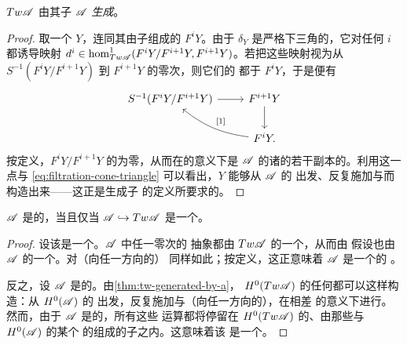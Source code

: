 \begin{lemma}\label{thm:tw-generated-by-a}
$Tw\mathscr{A}$ 由其\trFull{}子\trCategory{} $\mathscr{A}$ \emph{生成}。
\end{lemma}

\begin{proof}
取一个\trTwistedComplex{} $Y$，连同其由子\trComplex{}组成的\trFiltration{}%
$F^iY$。由于 $\delta_Y$ 是严格下三角的，它对任何 $i$ 都诱导映射
$d^i\in\hom^1_{Tw\mathscr{A}}(F^iY/F^{i+1}Y,F^{i+1}Y)$。若把这些映射视为从
$S^{-1}(F^iY/F^{i+1}Y)$ 到 $F^{i+1}Y$ 的零次\trMorphism，则它们的\trMappingCone{}%
都\trIsomorphic{}于 $F^iY$，于是便有\trExactTriangle
\begin{equation}\label{eq:filtration-cone-triangle}
\begin{tikzcd}
S^{-1}(F^iY/F^{i+1}Y) \ar[r] & F^{i+1}Y \ar[d] \\
& F^iY. \ar[ul,bend left=15,"{[1]}"{swap}]
\end{tikzcd}
\end{equation}
按定义，$F^iY/F^{i+1}Y$ 的\trDifferential{}为零，从而在\trIsomorphism{}的意义下是
$\mathscr{A}$ 的诸\trObject{}的若干\trSuspension{}副本的\trDirectSum。利用这一点与
\eqref{eq:filtration-cone-triangle} 可以看出，$Y$ 能够从 $\mathscr{A}$ 的\trObject{}%
出发、反复施加\trCone{}与\trSuspension{}而构造出来——这正是生成子%
\trCategory{}的定义所要求的。
\end{proof}

\begin{lemma}\label{thm:triangulated-iff-quasi-equivalence}
\trACategory{} $\mathscr{A}$ 是\trTriangulated{}的，当且仅当\trEmbedding{}%
$\mathscr{A}\hookrightarrow Tw\mathscr{A}$ 是一个\trQuasiequivalence。
\end{lemma}

\begin{proof}
设该\trEmbedding{}是一个\trQuasiequivalence。$\mathscr{A}$ 中任一零次\trCocycle{}的
抽象\trMappingCone{}都由 $Tw\mathscr{A}$ 的一个\trObject{}\trQuasiRepresent，从而由
假设也由 $\mathscr{A}$ 的一个\trObject{}\trQuasiRepresent。对（向任一方向的）%
\trSuspension{}同样如此；按定义，这正意味着 $\mathscr{A}$ 是一个\trTriangulated{}的%
\trACategory。

反之，设 $\mathscr{A}$ 是\trTriangulated{}的。由\cref{thm:tw-generated-by-a}，
$H^0(Tw\mathscr{A})$ 的任何\trObject{}都可以这样构造：从 $H^0(\mathscr{A})$ 的\trObject{}%
出发，反复施加\trMappingCone{}与（向任一方向的）\trSuspension，在相差%
\trIsomorphism{}的意义下进行。然而，由于 $\mathscr{A}$ 是\trTriangulated{}的，所有这些
运算都将停留在 $H^0(Tw\mathscr{A})$ 的、由那些与 $H^0(\mathscr{A})$ 的某个\trObject{}%
\trIsomorphic{}的\trObject{}组成的\trFull{}子\trCategory{}之内。这意味着该%
\trEmbedding{}是一个\trQuasiequivalence。
\end{proof}

